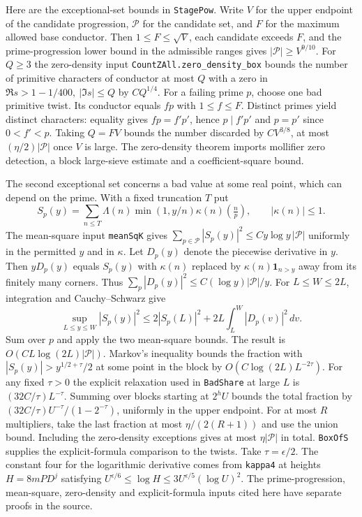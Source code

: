 Here are the exceptional-set bounds in \texttt{StagePow}. Write $V$
for the upper endpoint of the candidate progression, $\mathcal P$ for
the candidate set, and $F$ for the maximum allowed base conductor.
Then $1\le F\le\sqrt V$, each candidate exceeds $F$, and the
prime-progression lower bound in the admissible ranges gives
$|\mathcal P|\ge V^{9/10}$. For $Q\ge3$ the zero-density input
\texttt{CountZAll.zero\_density\_box} bounds the number of primitive
characters of conductor at most $Q$ with a zero in
$\Re s>1-1/400,\ |\Im s|\le Q$ by $C Q^{1/4}$.
For a failing prime $p$, choose one bad primitive twist. Its conductor
equals $fp$ with $1\le f\le F$. Distinct primes yield distinct
characters: equality gives $fp=f'p'$, hence $p\mid f'p'$ and
$p=p'$ since $0<f'<p$. Taking $Q=FV$ bounds the number discarded by
$CV^{3/8}$, at most $(\eta/2)|\mathcal P|$ once $V$ is large.
The zero-density theorem imports mollifier zero detection, a block
large-sieve estimate and a coefficient-square bound.

The second exceptional set concerns a bad value at some real point,
which can depend on the prime. With a fixed truncation $T$ put
\[
  S_p(y)=\sum_{n\le T}\Lambda(n)\min(1,y/n)\kappa(n)
                             (\tfrac np),\qquad |\kappa(n)|\le1 .
\]
The mean-square input \texttt{meanSqK} gives
$\sum_{p\in\mathcal P}|S_p(y)|^2\le C y\log y\,|\mathcal P|$
uniformly in the permitted $y$ and in $\kappa$. Let $D_p(y)$ denote
the piecewise derivative in $y$. Then $yD_p(y)$ equals $S_p(y)$ with
$\kappa(n)$ replaced by $\kappa(n)\mathbf 1_{n>y}$ away from its
finitely many corners. Thus $\sum_p|D_p(y)|^2\le C(\log y)|\mathcal
P|/y$. For $L\le W\le2L$, integration and Cauchy--Schwarz give
\[
  \sup_{L\le y\le W}|S_p(y)|^2
      \le 2|S_p(L)|^2+2L\int_L^W|D_p(v)|^2\,dv.
\]
Sum over $p$ and apply the two mean-square bounds. The result is
$O(CL\log(2L)|\mathcal P|)$. Markov's inequality bounds the fraction
with $|S_p(y)|>y^{1/2+\tau}/2$ at some point in the block by
$O(C\log(2L)L^{-2\tau})$. For any fixed $\tau>0$ the explicit
relaxation used in \texttt{BadShare} at large $L$ is
$(32C/\tau)L^{-\tau}$. Summing over blocks starting at $2^hU$ bounds
the total fraction by $(32C/\tau)U^{-\tau}/(1-2^{-\tau})$, uniformly
in the upper endpoint. For at most $R$ multipliers, take the last
fraction at most $\eta/(2(R+1))$ and use the union bound. Including
the zero-density exceptions gives at most $\eta|\mathcal P|$ in total.
\texttt{BoxOfS} supplies the explicit-formula comparison to the twists.
Take $\tau=\epsilon/2$. The constant four for the logarithmic derivative
comes from \texttt{kappa4} at heights $H=8mPD^j$ satisfying
$U^{\epsilon/6}\le\log H\le3U^{\epsilon/5}(\log U)^2$.
The prime-progression, mean-square, zero-density and explicit-formula
inputs cited here have separate proofs in the source.

